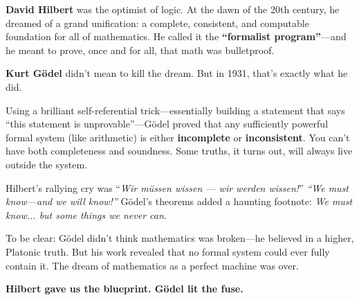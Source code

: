   
\begin{tcolorbox}[colback=blue!5!white, colframe=blue!50!black, 
  title={Historical Sidebar: Gödel and Hilbert—The Dream and the Detonation}]
  
  \textbf{David Hilbert} was the optimist of logic. At the dawn of the 20th century, he dreamed of a grand unification: a complete, consistent, and computable foundation for all of mathematics. He called it the \textbf{“formalist program”}—and he meant to prove, once and for all, that math was bulletproof.
  
  \medskip
  
  \textbf{Kurt Gödel} didn’t mean to kill the dream. But in 1931, that’s exactly what he did.
  
  Using a brilliant self-referential trick—essentially building a statement that says “this statement is unprovable”—Gödel proved that any sufficiently powerful formal system (like arithmetic) is either \textbf{incomplete} or \textbf{inconsistent}. You can’t have both completeness and soundness. Some truths, it turns out, will always live outside the system.
  
  \medskip
  
  Hilbert’s rallying cry was “\textit{Wir müssen wissen — wir werden wissen!}”  
  \emph{“We must know—and we will know!”}  
  Gödel’s theorems added a haunting footnote:  
  \emph{We must know... but some things we never can.}
  
  \medskip
  
  To be clear: Gödel didn’t think mathematics was broken—he believed in a higher, Platonic truth. But his work revealed that no formal system could ever fully contain it. The dream of mathematics as a perfect machine was over.
  
  \medskip
  
  \textbf{Hilbert gave us the blueprint. Gödel lit the fuse.}
  
\end{tcolorbox}



